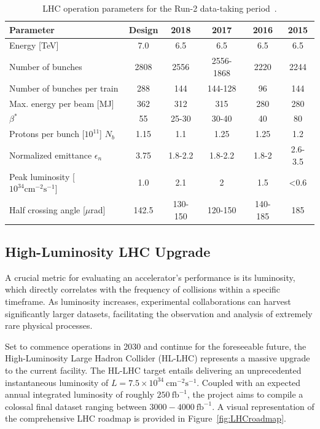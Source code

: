 \vspace*{0.5cm}
\begin{table}[htbp]
\centering
\caption{LHC operation parameters for the Run-2 data-taking period~\cite{Bruning:2004,Evans:2008zzb}.}
\label{tab:LHCrun2param}
\begin{tabular}{ l | c || c | c | c | c}
\hline
 \textbf{Parameter} & \textbf{Design} & \textbf{2018} & \textbf{2017} & \textbf{2016} & \textbf{2015} \\
 \hline
 Energy [TeV] & 7.0 & 6.5 & 6.5 & 6.5 & 6.5 \\
 Number of bunches & 2808 & 2556 & 2556-1868 & 2220 & 2244 \\
 Number of bunches per train & 288 & 144 & 144-128 & 96 &  144 \\
 Max. energy per beam [MJ] & 362 & 312 & 315 & 280 & 280 \\
 $\beta^*$ & 55 & 25-30 & 30-40 & 40 & 80 \\
 Protons per bunch [$10^{11}$] $N_b$ & 1.15 & 1.1 & 1.25 & 1.25 & 1.2 \\
 Normalized emittance $\epsilon_n$ & 3.75 & 1.8-2.2 & 1.8-2.2 & 1.8-2 & 2.6-3.5 \\
 Peak luminosity [$10^{34} \textrm{cm}^{-2} \textrm{s}^{-1}$] & 1.0 & 2.1 & 2 & 1.5  & <0.6 \\
 Half crossing angle [$\mu$rad] & 142.5 & 130-150    & 120-150 & 140-185 & 185 \\
\hline
\end{tabular}
\end{table}


\subsection{High-Luminosity LHC Upgrade}

A crucial metric for evaluating an accelerator's performance is its luminosity, which directly correlates with the frequency of collisions within a specific timeframe. As luminosity increases, experimental collaborations can harvest significantly larger datasets, facilitating the observation and analysis of extremely rare physical processes.

Set to commence operations in 2030 and continue for the foreseeable future, the High-Luminosity Large Hadron Collider (HL-LHC) represents a massive upgrade to the current facility. The HL-LHC target entails delivering an unprecedented instantaneous luminosity of $L = 7.5 \times 10^{34}~\text{cm}^{-2}\text{s}^{-1}$. Coupled with an expected annual integrated luminosity of roughly $250~\text{fb}^{-1}$, the project aims to compile a colossal final dataset ranging between $3000 - 4000~\text{fb}^{-1}$.
A visual representation of the comprehensive LHC roadmap is provided in Figure~\ref{fig:LHCroadmap}.

